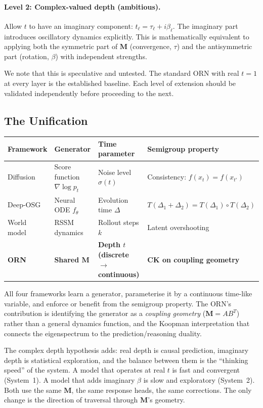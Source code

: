\documentclass[11pt, a4paper]{article}
\newcommand{\M}{\mathbf{M}}
\theoremstyle{plain}
\theoremstyle{remark}
\begin{document}
\paragraph{Level 2: Complex-valued depth (ambitious).}
Allow $t$ to have an imaginary component: $t_\ell = \tau_\ell + i\beta_\ell$.
The imaginary part introduces oscillatory dynamics explicitly.
This is mathematically equivalent to applying both the symmetric part of $\M$ (convergence, $\tau$) and the antisymmetric part (rotation, $\beta$) with independent strengths.

We note that this is speculative and untested.
The standard ORN with real $t = 1$ at every layer is the established baseline.
Each level of extension should be validated independently before proceeding to the next.

\subsection{The Unification}

\begin{center}
\small
\begin{tabular}{@{}llll@{}}
\toprule
\textbf{Framework} & \textbf{Generator} & \textbf{Time parameter} & \textbf{Semigroup property} \\
\midrule
Diffusion & Score function $\nabla \log p_t$ & Noise level $\sigma(t)$ & Consistency: $f(x_t) = f(x_{t'})$ \\
Deep-OSG & Neural ODE $f_\theta$ & Evolution time $\Delta$ & $T(\Delta_1{+}\Delta_2) = T(\Delta_1) \circ T(\Delta_2)$ \\
World model & RSSM dynamics & Rollout steps $k$ & Latent overshooting \\
\textbf{ORN} & \textbf{Shared $\M$} & \textbf{Depth $t$ (discrete $\to$ continuous)} & \textbf{CK on coupling geometry} \\
\bottomrule
\end{tabular}
\end{center}

All four frameworks learn a generator, parameterise it by a continuous time-like variable, and enforce or benefit from the semigroup property.
The ORN's contribution is identifying the generator as a \emph{coupling geometry} ($\M = AB^T$) rather than a general dynamics function, and the Koopman interpretation that connects the eigenspectrum to the prediction/reasoning duality.

The complex depth hypothesis adds: real depth is causal prediction, imaginary depth is statistical exploration, and the balance between them is the ``thinking speed'' of the system.
A model that operates at real $t$ is fast and convergent (System~1).
A model that adds imaginary $\beta$ is slow and exploratory (System~2).
Both use the same $\M$, the same response heads, the same corrections.
The only change is the direction of traversal through $\M$'s geometry.
\end{document}
